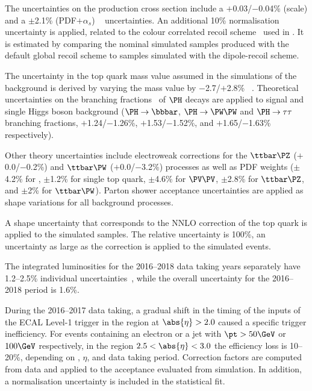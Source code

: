 The uncertainties on the \VBF production cross section include a $+$0.03/$-$0.04\% (scale) and  a $\pm$2.1\% (PDF$+\alpha_s$) ~\cite{Ling:2014sne, Dreyer:2018rfu} uncertainties. An additional 10\% normalisation uncertainty is applied, related to the colour correlated recoil scheme~\cite{dipoleShoweStudies} used in \PYTHIA. It is estimated by comparing the nominal simulated samples produced with the default global recoil scheme to samples simulated with the dipole-recoil scheme.

The uncertainty in the top quark mass value assumed in the simulations of the \ttbar background is derived by varying the mass value by $-$2.7/$+$2.8\% ~\cite{deFlorian:2017qfk}. Theoretical uncertainties on the branching fractions~\cite{deFlorian:2016spz} of $\PHiggs$ decays are applied to \HH signal and single Higgs boson background ($\PHiggs\to\bb$, $\PHiggs\to\WW$ and $\PHiggs\to\tau\tau$ branching fractions, $+$1.24/$-$1.26\%, $+$1.53/$-$1.52\%, and $+$1.65/$-$1.63\% respectively).

Other theory uncertainties include electroweak corrections for the $\ttbar\PZ$ ($+$0.0/$-$0.2\%) and $\ttbar\PW$ ($+$0.0/$-$3.2\%) processes as well as PDF weights ($\pm$4.2\% for \ttbar, $\pm$1.2\% for single top quark, $\pm$4.6\% for $\PV\PV$, $\pm$2.8\% for $\ttbar\PZ$, and $\pm$2\% for $\ttbar\PW$). Parton shower acceptance uncertainties are applied as shape variations for all background processes.

A shape uncertainty that corresponds to the NNLO correction of the top quark \pt is applied to the \ttbar simulated samples. The relative uncertainty is 100\%, \ie an uncertainty as large as the correction is applied to the simulated \ttbar events.

The integrated luminosities for the 2016--2018 data taking years separately have 1.2--2.5\% individual uncertainties~\cite{LUM-17-003,LUM-17-004,LUM-18-002}, while the overall uncertainty for the 2016--2018 period is 1.6\%.

During the 2016--2017 data taking, a gradual shift in the timing of the inputs of the ECAL Level-1 trigger in the region at $\abs{\eta} > 2.0$ caused a specific trigger inefficiency. For events containing an electron or a jet with $\pt> 50\GeV$ or $100\GeV$ respectively, in the region $2.5 < \abs{\eta} < 3.0$ the efficiency loss is 10--20\%, depending on \pt, $\eta$, and data taking period. Correction factors are computed from data and applied to the acceptance evaluated from simulation. In addition, a normalisation uncertainty is included in the statistical fit.

